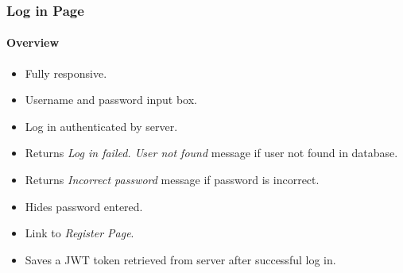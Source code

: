 \subsubsection{Log in Page}  \label{loginpage}

\paragraph{Overview\newline}
\begin{itemize}
    \item Fully responsive.
    \item Username and password input box.
    \item Log in authenticated by server.
    \item Returns {\color{red}\textit{Log in failed. User not found}} message if user not found in database.
    \item Returns {\color{red}\textit{Incorrect password}} message if password is incorrect.
    \item Hides password entered.
    \item Link to \textit{Register Page}.
    \item Saves a JWT token retrieved from server after successful log in.
\end{itemize}

